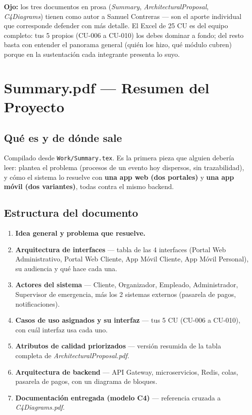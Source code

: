 \documentclass[12pt,a4paper]{article}
\begin{document}
\begin{alerta}
\textbf{Ojo:} los tres documentos en prosa (\textit{Summary}, \textit{ArchitecturalProposal},
\textit{C4Diagrams}) tienen como autor a Samuel Contreras --- son el aporte individual que
corresponde defender con más detalle. El Excel de 25 CU es del equipo completo: tus 5 propios
(CU-006 a CU-010) los debes dominar a fondo; del resto basta con entender el panorama general
(quién los hizo, qué módulo cubren) porque en la sustentación cada integrante presenta lo suyo.
\end{alerta}

\section{Summary.pdf --- Resumen del Proyecto}

\subsection{Qué es y de dónde sale}

Compilado desde \texttt{Work/Summary.tex}. Es la primera pieza que alguien debería leer: plantea el
problema (procesos de un evento hoy dispersos, sin trazabilidad), y cómo el sistema lo resuelve con
\textbf{una app web (dos portales)} y \textbf{una app móvil (dos variantes)}, todas contra el mismo
backend.

\subsection{Estructura del documento}

\begin{enumerate}
\item \textbf{Idea general y problema que resuelve.}
\item \textbf{Arquitectura de interfaces} --- tabla de las 4 interfaces (Portal Web Administrativo,
Portal Web Cliente, App Móvil Cliente, App Móvil Personal), su audiencia y qué hace cada una.
\item \textbf{Actores del sistema} --- Cliente, Organizador, Empleado, Administrador, Supervisor de
emergencia, más los 2 sistemas externos (pasarela de pagos, notificaciones).
\item \textbf{Casos de uso asignados y su interfaz} --- tus 5 CU (CU-006 a CU-010), con cuál
interfaz usa cada uno.
\item \textbf{Atributos de calidad priorizados} --- versión resumida de la tabla completa de
\textit{ArchitecturalProposal.pdf}.
\item \textbf{Arquitectura de backend} --- API Gateway, microservicios, Redis, colas, pasarela de
pagos, con un diagrama de bloques.
\item \textbf{Documentación entregada (modelo C4)} --- referencia cruzada a \textit{C4Diagrams.pdf}.
\end{enumerate}
\end{document}
